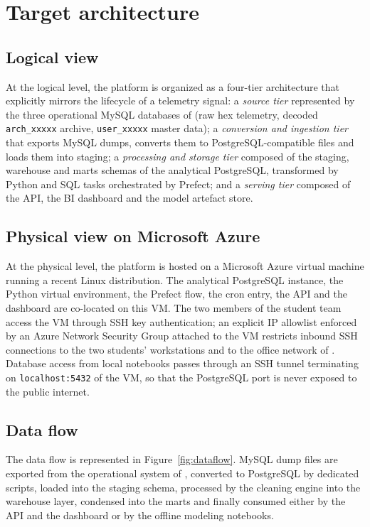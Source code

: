 \section{Target architecture}

\subsection{Logical view}
At the logical level, the platform is organized as a four-tier architecture that explicitly mirrors the lifecycle of a telemetry signal: a \emph{source tier} represented by the three operational MySQL databases of \hostorg{} (raw hex telemetry, decoded \texttt{arch\_xxxxx} archive, \texttt{user\_xxxxx} master data); a \emph{conversion and ingestion tier} that exports MySQL dumps, converts them to PostgreSQL-compatible files and loads them into staging; a \emph{processing and storage tier} composed of the staging, warehouse and marts schemas of the analytical PostgreSQL, transformed by Python and SQL tasks orchestrated by Prefect; and a \emph{serving tier} composed of the API, the BI dashboard and the model artefact store.

\subsection{Physical view on Microsoft Azure}
\label{ssec:physical-view}
At the physical level, the platform is hosted on a Microsoft Azure virtual machine running a recent Linux distribution. The analytical PostgreSQL instance, the Python virtual environment, the Prefect flow, the cron entry, the API and the dashboard are co-located on this VM. The two members of the student team access the VM through SSH key authentication; an explicit IP allowlist enforced by an Azure Network Security Group attached to the VM restricts inbound SSH connections to the two students' workstations and to the office network of \hostorg. Database access from local notebooks passes through an SSH tunnel terminating on \texttt{localhost:5432} of the VM, so that the PostgreSQL port is never exposed to the public internet.

\subsection{Data flow}
The data flow is represented in Figure~\ref{fig:dataflow}. MySQL dump files are exported from the operational system of \hostorg, converted to PostgreSQL by dedicated scripts, loaded into the staging schema, processed by the cleaning engine into the warehouse layer, condensed into the marts and finally consumed either by the API and the dashboard or by the offline modeling notebooks.

